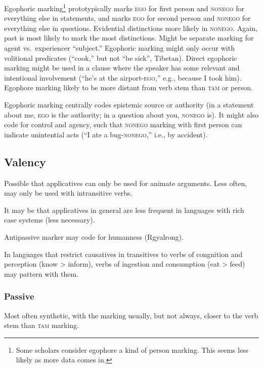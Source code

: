 \documentclass[11pt]{article}
\newcommand{\I}[1]{\textsc{#1}}   %
\begin{document}
Egophoric marking\footnote{Some scholars consider egophore a kind of
  person marking.  This seems less likely as more data comes in.}
prototypically marks \I{ego} for first person and \I{nonego} for
everything else in statements, and marks \I{ego} for second person and
\I{nonego} for everything else in questions.  Evidential distinctions
more likely in \I{nonego}.  Again, past is most likely to mark the
most distinctions.  Might be separate marking for agent
vs.\ experiencer ``subject.''  Egophoric marking might only occur with
volitional predicates (``cook,'' but not ``be sick'', Tibetan).
Direct egophoric marking might be used in a clause where the speaker
has some relevant and intentional involvement (``he's at the
airport-\I{ego},'' e.g., because I took him).  Egophore marking likely
to be more distant from verb stem than \I{tam} or person.

Egophoric marking centrally codes epistemic source or authority (in a
statement about me, \I{ego} is the authority; in a question about you,
\I{nonego} is).  It might also code for control and agency, such that
\I{nonego} marking with first person can indicate unintential acts
(``I ate a bug-\I{nonego},'' i.e., by accident).


\subsection{Valency}
Possible that applicatives can only be used for animate arguments.
Less often, may only be used with intransitive verbs.

It may be that applicatives in general are less frequent in languages
with rich case systems (less necessary).

Antipassive marker may code for humanness (Rgyalrong).

In languages that restrict causatives in transitives to verbs of
congnition and perception (know > inform), verbs of ingestion and
consumption (eat > feed) may pattern with them.

\subsubsection{Passive} Most often synthetic, with the marking usually,
but not always, closer to the verb stem than \I{tam} marking.
\end{document}
